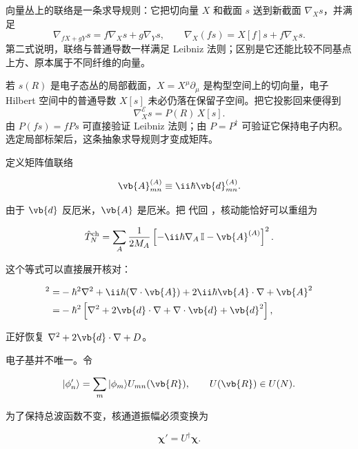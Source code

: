 \begin{definition}[联络]
向量丛上的联络是一条求导规则：它把切向量 \(X\) 和截面 \(s\) 送到新截面 \(\nabla_Xs\)，并满足
\[
\nabla_{fX+gY}s=f\nabla_Xs+g\nabla_Ys,\qquad
\nabla_X(fs)=X[f]s+f\nabla_Xs.
\]
第二式说明，联络与普通导数一样满足 Leibniz 法则；区别是它还能比较不同基点上方、原本属于不同纤维的向量。
\end{definition}

若 \(s(R)\) 是电子态丛的局部截面，\(X=X^\mu\partial_\mu\) 是构型空间上的切向量，电子 Hilbert 空间中的普通导数 \(X[s]\) 未必仍落在保留子空间。把它投影回来便得到
\begin{equation}
\nabla_X^{\mathcal E}s=P(R)\,X[s].
\label{eq:projected-bundle-connection}
\end{equation}
由 \(P(fs)=fPs\) 可直接验证 Leibniz 法则；由 \(P=P^\dagger\) 可验证它保持电子内积。选定局部标架后，这条抽象求导规则才变成矩阵。

定义矩阵值联络

\begin{equation}
\vb{A}_{mn}^{(A)}
\equiv\ii\hbar\vb{d}_{mn}^{(A)}.
\label{eq:nonabelian-connection}
\end{equation}

由于 \(\vb{d}\) 反厄米，\(\vb{A}\) 是厄米。把  代回 ，核动能恰好可以重组为

\begin{equation}
\hat T_N^{\rm ch}
=\sum_A\frac1{2M_A}
\left[-\ii\hbar\nabla_A\,\mathbb I-\vb{A}^{(A)}\right]^2.
\label{eq:covariant-nuclear-kinetic}
\end{equation}

这个等式可以直接展开核对：

\begin{align*}
[-\ii\hbar\nabla-\vb{A}]^2
=&-\hbar^2\nabla^2
+\ii\hbar(\nabla\cdot\vb{A})
+2\ii\hbar\vb{A}\cdot\nabla
+\vb{A}^2
\\
=&-\hbar^2
\left[
\nabla^2
+2\vb{d}\cdot\nabla
+\nabla\cdot\vb{d}
+\vb{d}^2
\right],
\end{align*}

正好恢复 \(\nabla^2+2\vb{d}\cdot\nabla+D\)。

电子基并不唯一。令

\[
|\phi_n'\rangle
=\sum_m|\phi_m\rangle U_{mn}(\vb{R}),
\qquad U(\vb{R})\in U(N).
\]

为了保持总波函数不变，核通道振幅必须变换为

\[
\boldsymbol\chi'=U^\dagger\boldsymbol\chi.
\]

